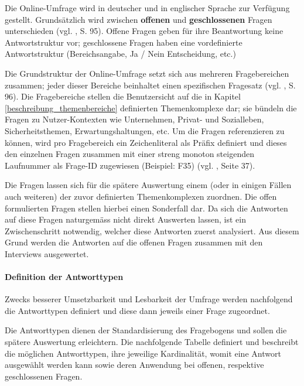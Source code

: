 \documentclass[../../main.tex]{subfiles}
\begin{document}
\begin{sloppypar}
Die Online-Umfrage wird in deutscher und in englischer Sprache zur Verfügung gestellt. Grundsätzlich wird zwischen \textbf{offenen} und \textbf{geschlossenen} Fragen unterschieden (vgl. \cite{berekoven_marktforschung:_2009}, S. 95). Offene Fragen geben für ihre Beantwortung keine Antwortstruktur vor; geschlossene Fragen haben eine vordefinierte Antwortstruktur (Bereichsangabe, Ja / Nein Entscheidung, etc.)

Die Grundstruktur der Online-Umfrage setzt sich aus mehreren Fragebereichen zusammen; jeder dieser Bereiche beinhaltet einen spezifischen Fragesatz (vgl. \cite{mayer_interview_2013}, S. 96). Die Fragebereiche stellen die Benutzersicht auf die in Kapitel \ref{beschreibung_themenbereiche} definierten Themenkomplexe dar; sie bündeln die Fragen zu Nutzer-Kontexten wie Unternehmen, Privat- und Sozialleben, Sicherheitsthemen, Erwartungshaltungen, etc. Um die Fragen referenzieren zu können, wird pro Fragebereich ein Zeichenliteral als Präfix definiert und dieses den einzelnen Fragen zusammen mit einer streng monoton steigenden Laufnummer als Frage-ID zugewiesen (Beispiel: F35) (vgl. \cite{kirchhoff_fragebogen:_2010}, Seite 37).

Die Fragen lassen sich für die spätere Auswertung einem (oder in einigen Fällen auch weiteren) der zuvor definierten Themenkomplexen zuordnen. Die offen formulierten Fragen stellen hierbei einen Sonderfall dar. Da sich die Antworten auf diese Fragen naturgemäss nicht direkt Auswerten lassen, ist ein Zwischenschritt notwendig, welcher diese Antworten zuerst analysiert. Aus diesem Grund werden die Antworten auf die offenen Fragen zusammen mit den Interviews ausgewertet.\footnotemark
 \end{sloppypar}


\paragraph*{Definition der Antworttypen}\mbox{}

\begin{sloppypar}
Zwecks besserer Umsetzbarkeit und Lesbarkeit der Umfrage werden nachfolgend die Antworttypen definiert und diese dann jeweils einer Frage zugeordnet.

Die Antworttypen dienen der Standardisierung des Fragebogens und sollen die spätere Auswertung erleichtern. Die nachfolgende Tabelle definiert und beschreibt die möglichen Antworttypen, ihre jeweilige Kardinalität, womit eine Antwort ausgewählt werden kann sowie deren Anwendung bei offenen, respektive geschlossenen Fragen.
\end{sloppypar}
\end{document}
